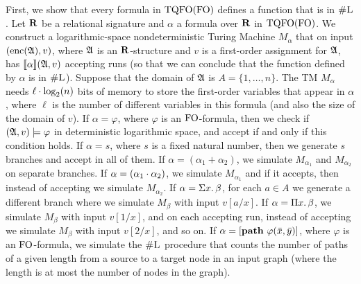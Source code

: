 
First, we show that every formula in ${\rm TQFO}({\rm FO})$ defines a function that is in $\text{\sc \#L}$.
Let $\mathbf{R}$ be a relational signature and $\alpha$ a formula over $\mathbf{R}$ in ${\rm TQFO}({\rm FO})$. 
We construct a logarithmic-space nondeterministic Turing Machine $M_{\alpha}$ that on input $({\rm enc}(\mathfrak{A}),v)$, where $\mathfrak{A}$ is an $\mathbf{R}$-structure and $v$ is a first-order assignment for $\mathfrak{A}$, has ${\llbracket{}{\alpha}\rrbracket}(\mathfrak{A},v)$ accepting runs (so that we can conclude that the function defined by $\alpha$ is in $\text{\sc \#L}$). 
Suppose that the domain of $\mathfrak{A}$ is $A = \{1,\ldots,n\}$. The TM $M_{\alpha}$ needs $\ell \cdot\log_2(n)$ bits of memory to store the first-order variables that appear in $\alpha$, where $\ell$ is the number of different variables in this formula (and also the size of the domain of $v$). 
If $\alpha = \varphi$, where $\varphi$ is an ${\rm FO}$-formula, then we check if $(\mathfrak{A},v)\models\varphi$ in deterministic logarithmic space, and accept if and only if this condition holds. If $\alpha = s$, where $s$ is a fixed natural number, then we generate $s$ branches and accept in all of them. 
If $\alpha = (\alpha_1 + \alpha_2)$, we simulate $M_{\alpha_1}$ and $M_{\alpha_2}$ on separate branches. If $\alpha = (\alpha_1\cdot\alpha_2)$, we simulate $M_{\alpha_1}$ and if it accepts, then instead of accepting we simulate $M_{\alpha_2}$. If $\alpha = \Sigma{x}.\,\beta$, for each $a\in A$ we generate a different branch where we simulate $M_{\beta}$ with input $v[a/x]$. If $\alpha = \Pi{x}.\,\beta$, we simulate $M_{\beta}$ with input $v[1/x]$, and on each accepting run, instead of accepting we simulate $M_{\beta}$ with input $v[2/x]$, and so on.
If $\alpha = [{\bf path} \,\, \varphi(\bar{x},\bar{y})]$, where $\varphi$ is an ${\rm FO}$-formula, we simulate the $\text{\sc \#L}$ procedure that counts the number of paths of a given length from a source to a target node in an input graph (where the length is at most the number of nodes in the graph).

